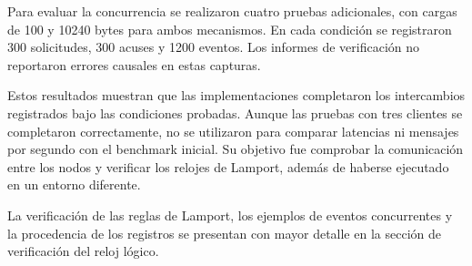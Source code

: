 Para evaluar la concurrencia se realizaron
cuatro pruebas adicionales, con cargas de
100 y 10240 bytes para ambos mecanismos.
En cada condición se registraron 300
solicitudes, 300 acuses y 1200 eventos.
Los informes de verificación no reportaron
errores causales en estas capturas.

Estos resultados muestran que las
implementaciones completaron los intercambios
registrados bajo las condiciones probadas.
Aunque las pruebas con tres clientes se completaron
correctamente, no se utilizaron para comparar
latencias ni mensajes por segundo con el benchmark
inicial. Su objetivo fue comprobar la comunicación
entre los nodos y verificar los relojes de Lamport,
además de haberse ejecutado en un entorno diferente.

La verificación de las reglas de Lamport,
los ejemplos de eventos concurrentes y
la procedencia de los registros se
presentan con mayor detalle en la
sección de verificación del reloj lógico.

